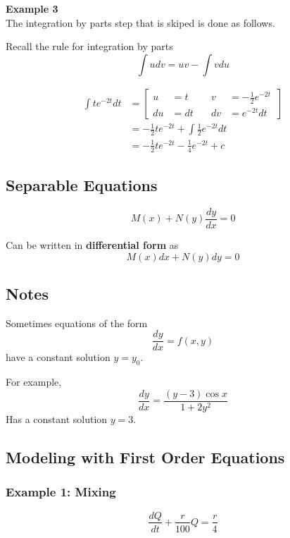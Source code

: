 \textbf{Example 3}
\\

The integration by parts step that is skiped is done as follows.

Recall the rule for integration by parts
$$
\int u dv = uv - \int v du
$$

\begin{align*}
\int t e^{-2t} dt &= 
    \left[
      \begin{alignedat}{2}
      u  &= t   \quad & v  &= -\frac{1}{2}e^{-2t} \\
      du &= dt  \quad & dv &= e^{-2t} dt 
      \end{alignedat}\,
    \right] \\
&= -\frac{1}{2} t e^{-2t} + \int \frac{1}{2}e^{-2t} dt \\
&= -\frac{1}{2} t e^{-2t} - \frac{1}{4}e^{-2t} + c
\end{align*}



\subsection{Separable Equations}

$$
M(x) + N(y) \frac{dy}{dx} = 0
$$

Can be written in \textbf{differential form} as
$$
M(x)dx + N(y)dy = 0
$$


\subsection{Notes}

Sometimes equations of the form
$$
\frac{dy}{dx} = f(x,y)
$$
have a constant solution $y = y_0$.

For example,
$$
\frac{dy}{dx} = \frac{(y-3) \cos{x}}{1+2y^2}
$$
Has a constant solution $y=3$.
\\





\subsection{Modeling with First Order Equations}


\subsubsection{Example 1: Mixing}
$$
\frac{d Q}{dt} + \frac{r}{100}Q = \frac{r}{4}
$$

